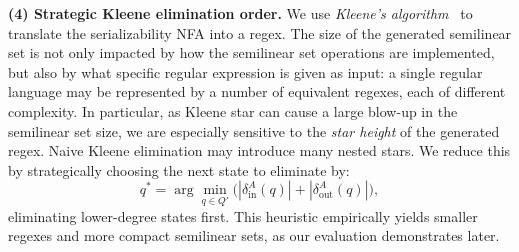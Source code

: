 

\medskip
\noindent
\textbf{(4) Strategic Kleene elimination order.} 
%
We use \textit{Kleene's algorithm}~\cite{Kl56} to translate the serializability NFA into a regex.
% 
The size of the generated semilinear set is not only impacted by how the
	semilinear set operations are implemented, but also by what specific regular
	expression is given as input: a single regular language may be represented by a
	number of equivalent regexes, each of different complexity.
	In particular, as Kleene star can cause a large blow-up in the semilinear set size,
	we are especially sensitive to the \emph{star height} of the generated regex.
	Naive Kleene elimination may introduce many nested stars.  
	We reduce this by strategically choosing the next state to eliminate by:
	\[
	q^*=\arg\min_{q\in Q'}\bigl(|\delta^A_{\mathrm{in}}(q)|+|\delta^A_{\mathrm{out}}(q)|\bigr),
	\]
	eliminating lower-degree states first.  
	This heuristic empirically yields smaller regexes and more compact semilinear sets, as our evaluation demonstrates later.


